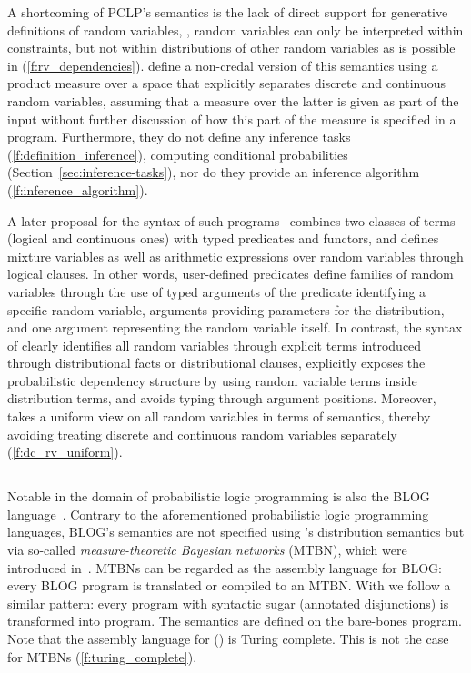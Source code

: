 A shortcoming of PCLP's semantics is the lack of direct support for generative definitions of random variables, \ie, random variables can only be interpreted within constraints, but not within distributions of other random variables as is possible in \dcproblogsty (\ref{f:rv_dependencies}).
\citet{azzolini2021semantics} define a non-credal version of this semantics using a product measure over a space that explicitly separates discrete and continuous random variables, assuming that a measure over the latter is given as part of the input without further discussion of how this part of the measure is specified in a program. Furthermore, they do not define any inference tasks (\ref{f:definition_inference}), \eg computing conditional probabilities (\cf Section~\ref{sec:inference-tasks}), nor
do they provide an inference algorithm (\ref{f:inference_algorithm}).

A later proposal for the syntax of such programs~\citep{azzolini:iclp21} combines two classes of terms (logical and continuous ones) with typed predicates and functors, and defines mixture variables as well as arithmetic expressions over random variables through logical clauses. In other words, user-defined predicates define families of random variables through the use of typed arguments of the predicate identifying a specific random variable, arguments providing parameters for the distribution, and one argument representing the random variable itself.
In contrast, the syntax of \dcproblogsty clearly identifies all  random variables through explicit terms introduced through distributional facts or distributional clauses, explicitly exposes the probabilistic dependency structure by using random variable terms inside distribution terms, and avoids typing through argument positions.
Moreover, \dcproblogsty takes a uniform view on all random variables in terms of semantics, thereby avoiding treating discrete and continuous random variables separately (\ref{f:dc_rv_uniform}).

\subsection{\blogsty}


Notable in the domain of probabilistic logic programming is also the BLOG language~\citep{milch2005blog,wu2018discrete}. Contrary to the aforementioned probabilistic logic programming languages, BLOG's semantics are not specified using \citeauthor{sato1995statistical}'s distribution semantics but via so-called {\em measure-theoretic Bayesian networks} (MTBN), which were introduced in~\citep{wu2018discrete}. MTBNs can be regarded as the assembly language for BLOG: every BLOG program is translated or compiled to an MTBN.
With \dcproblogsty we follow a similar pattern: every \dcproblogsty program with syntactic sugar (\eg annotated disjunctions)  is transformed into \dfplpsty program. The semantics are defined on the bare-bones program. Note that the assembly language for \dcproblogsty (\dfplpsty) is Turing complete. This is not the case for MTBNs (\ref{f:turing_complete}).

